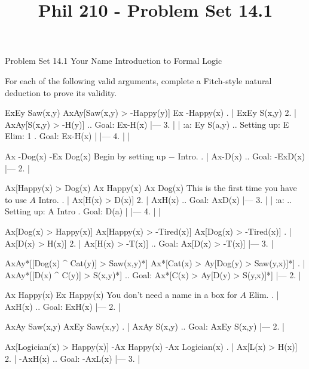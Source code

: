 
\title{Phil 210 - Problem Set 14.1}

\heading
Problem Set 14.1
Your Name
Introduction to Formal Logic
\endheading

For each of the following valid arguments, complete a Fitch-style natural deduction to prove its validity.

\quantifiers
\problems
{}
\argument
 ExEy Saw(x,y)
 AxAy[Saw(x,y) > -Happy(y)]
\argumentline
 Ex -Happy(x)
\endargument
	\answer
	. | ExEy S(x,y)
	 2. | AxAy[S(x,y) > -H(y)]  ..  Goal: Ex-H(x)
	    |---
	 3. |   | :a: Ey S(a,y)     ..  Setting up: E Elim: 1  .  Goal: Ex-H(x)
	    |   |---
	 4. |   |
	\endfitchproof
	\endanswer

\argument
 Ax -Dog(x)
\argumentline
 -Ex Dog(x)
\endargument
\Hint Begin by setting up $-$ Intro.
	\answer
	. | Ax-D(x)  ..  Goal: -ExD(x)
	    |---
	 2. | 
	\endfitchproof
	\endanswer

\argument
 Ax[Happy(x) > Dog(x)
 Ax Happy(x)
\argumentline
 Ax Dog(x)
\endargument
\Hint This is the first time you have to use $A$ Intro.
	\answer
	. | Ax[H(x) > D(x)]
	 2. | AxH(x)          ..  Goal: AxD(x)
	    |---
	 3. |   | :a:          ..  Setting up: A Intro  .  Goal: D(a)
	    |   |---
	 4. |   |
	\endfitchproof
	\endanswer

\argument
 Ax[Dog(x) > Happy(x)]
 Ax[Happy(x) > -Tired(x)]
\argumentline
 Ax[Dog(x) > -Tired(x)]
\endargument
	\answer
	. | Ax[D(x) > H(x)]
	 2. | Ax[H(x) > -T(x)]  ..  Goal: Ax[D(x) > -T(x)]
	    |---
	 3. | 
	\endfitchproof
	\endanswer

\argument
 AxAy*[[Dog(x) ^ Cat(y)] > Saw(x,y)*]
\argumentline
 Ax*[Cat(x) > Ay[Dog(y) > Saw(y,x)]*]
\endargument
	\answer
	. | AxAy*[[D(x) ^ C(y)] > S(x,y)*]  ..  Goal: Ax*[C(x) > Ay[D(y) > S(y,x)]*]
	    |---
	 2. | 
	\endfitchproof
	\endanswer

\argument
 Ax Happy(x)
\argumentline
 Ex Happy(x)
\endargument
\Hint You don't need a name in a box for $A$ Elim.
	\answer
	. | AxH(x)  ..  Goal: ExH(x)
	    |---
	 2. | 
	\endfitchproof
	\endanswer

\argument
 AxAy Saw(x,y)
\argumentline
 AxEy Saw(x,y)
\endargument
	\answer
	. | AxAy S(x,y)  ..  Goal: AxEy S(x,y)
	    |---
	 2. |
	\endfitchproof
	\endanswer

\argument
 Ax[Logician(x) > Happy(x)]
 -Ax Happy(x)
\argumentline
 -Ax Logician(x)
\endargument
	\answer
	. | Ax[L(x) > H(x)]
	 2. | -AxH(x)         ..  Goal: -AxL(x)
	    |---
	 3. |
	\endfitchproof
	\endanswer

\endproblems
\bye
